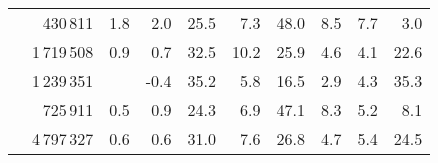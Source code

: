 \begin{longtable}{p{3cm}<{\raggedright}d{7.0}d{2.1}d{1.1}d{2.1}d{2.1}d{2.1}d{2.1}d{1.1}d{2.1}}
   & 430\,811 & 1.8 & 2.0 & 25.5 & 7.3 & 48.0 & 8.5 & 7.7 & 3.0 \\ 
   & 1\,719\,508 & 0.9 & 0.7 & 32.5 & 10.2 & 25.9 & 4.6 & 4.1 & 22.6 \\ 
   & 1\,239\,351 &  & -0.4 & 35.2 & 5.8 & 16.5 & 2.9 & 4.3 & 35.3 \\ 
   & 725\,911 & 0.5 & 0.9 & 24.3 & 6.9 & 47.1 & 8.3 & 5.2 & 8.1 \\ 
   & 4\,797\,327 & 0.6 & 0.6 & 31.0 & 7.6 & 26.8 & 4.7 & 5.4 & 24.5 \\ 
  \hline
\end{longtable}
